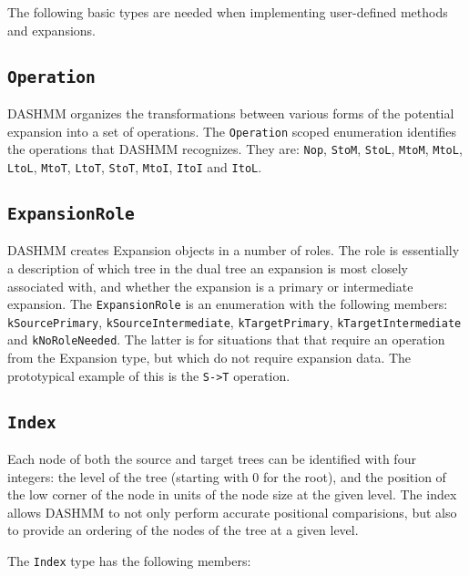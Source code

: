 The following basic types are needed when implementing user-defined methods and
expansions.

\subsection{\texttt{Operation}}

DASHMM organizes the transformations between various forms of the potential
expansion into a set of operations. The \texttt{Operation} scoped enumeration
identifies the operations that DASHMM recognizes. They are: \texttt{Nop},
\texttt{StoM}, \texttt{StoL}, \texttt{MtoM}, \texttt{MtoL}, \texttt{LtoL},
\texttt{MtoT}, \texttt{LtoT}, \texttt{StoT}, \texttt{MtoI}, \texttt{ItoI}
and \texttt{ItoL}.

\subsection{\texttt{ExpansionRole}}

DASHMM creates Expansion objects in a number of roles. The role is essentially
a description of which tree in the dual tree an expansion is most closely
associated with, and whether the expansion is a primary or intermediate
expansion.  The \texttt{ExpansionRole} is an enumeration with the following
members: \texttt{kSourcePrimary}, \texttt{kSourceIntermediate},
\texttt{kTargetPrimary}, \texttt{kTargetIntermediate} and
\texttt{kNoRoleNeeded}. The latter is for situations that that require an
operation from the Expansion type, but which do not require expansion data.
The prototypical example of this is the \texttt{S->T} operation.

\subsection{\texttt{Index}}

Each node of both the source and target trees can be identified with four
integers: the level of the tree (starting with 0 for the root), and the
position of the low corner of the node in units of the node size at the given
level. The index allows DASHMM to not only perform accurate positional
comparisions, but also to provide an ordering of the nodes of the tree at a
given level.

The \texttt{Index} type has the following members:

